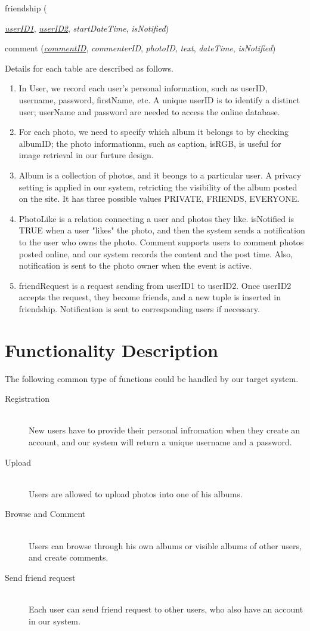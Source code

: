\documentclass[a4paper,12pt]{article}
\begin{document}
friendship ({\emph{\underline{userID1}}, \emph{\underline{userID2}}, \emph{startDateTime}, \emph{isNotified})

comment (\emph{\underline{commentID}}, \emph{commenterID}, \emph{photoID}, \emph{text}, \emph{dateTime}, \emph{isNotified})


Details for each table are described as follows.

\begin{enumerate}
  \item In User, we record each user's personal information, such as userID, username, password, firstName, etc. A unique userID is to identify a distinct user; userName and password are needed to access the online database.
  \item For each photo, we need to specify which album it belongs to by checking albumID; the photo informationm, such as caption, isRGB, is useful for image retrieval in our furture design.
  \item Album is a collection of photos, and it beongs to a particular user. A privacy setting is applied in our system, retricting the visibility of the album posted on the site. It has three possible values PRIVATE, FRIENDS, EVERYONE.
  \item PhotoLike is a relation connecting a user and photos they like. isNotified is TRUE when a user "likes" the photo, and then the system sends a notification to the user who owns the photo. Comment supports users to comment photos posted online, and our system records the content and the post time. Also, notification is sent to the photo owner when the event is active.
  \item friendRequest is a request sending from userID1 to userID2. Once userID2 accepts the request, they become friends, and a new tuple is inserted in friendship. Notification is sent to corresponding users if necessary.
\end{enumerate}

\section*{Functionality Description}
The following common type of functions could be handled by our target system.

\begin{description}
  \item[Registration] \hfill \\
  New users have to provide their personal infromation when they create an account, and our system will return a unique username and a password.
  \item[Upload] \hfill \\
  Users are allowed to upload photos into one of his albums. 
  \item[Browse and Comment] \hfill \\
  Users can browse through his own albums or visible albums of other users, and create comments.
  \item[Send friend request] \hfill \\
  Each user can send friend request to other users, who also have an account in our system.
\end{description}

}
\end{document}
